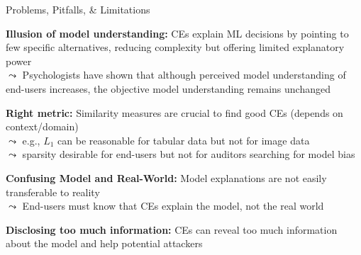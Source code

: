 \documentclass[10pt,compress,t,notes=noshow, xcolor=table]{beamer}
\begin{document}
\begin{framei}[align=top]{Problems, Pitfalls, \& Limitations}
\item<+-> \textbf{Illusion of model understanding:} CEs explain ML decisions by pointing to few specific alternatives, reducing complexity but offering limited explanatory power\\
$\leadsto$ Psychologists have shown that although perceived model understanding of end-users increases, the objective model understanding remains unchanged
\item<+-> \textbf{Right metric:} Similarity measures are crucial to find good CEs (depends on context/domain)\\
$\leadsto$ e.g., $L_1$ can be reasonable for tabular data but not for image data\\
$\leadsto$ sparsity desirable for end-users but not for auditors searching for model bias
\item<+-> \textbf{Confusing Model and Real-World:} Model explanations are not easily transferable to reality\\
$\leadsto$ End-users must know that CEs explain the model, not the real world %
\item<+-> \textbf{Disclosing too much information:}
CEs can reveal too much information about the model and help potential attackers
\end{framei}
\end{document}
